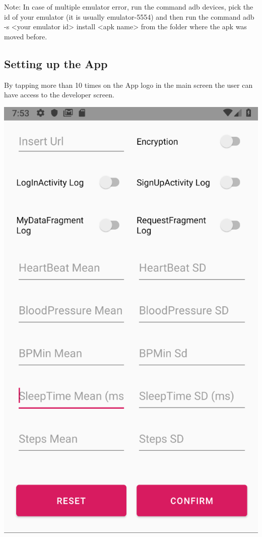 Note: In case of multiple emulator error, run the command adb devices, pick the id of your emulator (it is usually emulator-5554) and then run the command adb -s <your emulator id> install <apk name> from the folder where the apk was moved before.


\subsection{Setting up the App}\label{setting_android}

By tapping more than 10 times on the App logo in the main screen the user can have access to the developer screen.


\begin{center}
   \includegraphics[scale=0.7]{resources/developerscreen.png}
\end{center}



